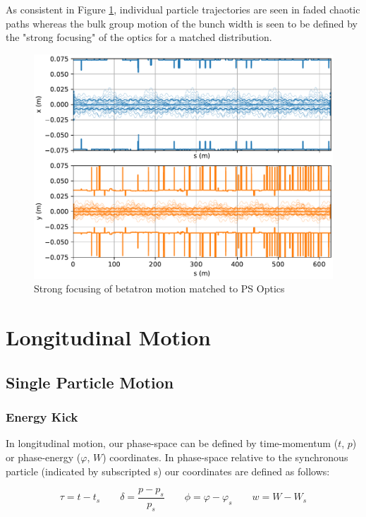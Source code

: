 As consistent in Figure \ref{fig:ps_transverse_tracking}, individual particle trajectories are seen in faded chaotic paths whereas the bulk group motion of the bunch width is seen to be defined by the "strong focusing" of the optics for a matched distribution.

\begin{figure}
    \centering
    \includegraphics{figs/ps_aperture.multivariate.pdf}
    \caption{Strong focusing of betatron motion matched to PS Optics}
    \label{fig:ps_transverse_tracking}
\end{figure}

\section{Longitudinal Motion}

\subsection{Single Particle Motion}

\subsubsection{Energy Kick}

In longitudinal motion, our phase-space can be defined by time-momentum ($t$, $p$) or phase-energy ($\varphi$, $W$) coordinates. In phase-space relative to the synchronous particle (indicated by subscripted s) our coordinates are defined as follows:

$$\tau = t - t_s \qquad \delta = \frac{p-p_s}{p_s} \qquad \phi = \varphi - \varphi_s \qquad w = W-W_s$$

